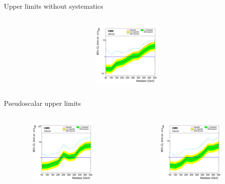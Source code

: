 \documentclass[8pt]{beamer}
\begin{document}
\begin{frame}{Upper limits without systematics}
\begin{columns}
\begin{column}{0.33\textwidth}
\begin{center}
     			\includegraphics[width=1.0\textwidth, height=90pt]{figs/limit_scalar2018.png}
    		\end{center}		
		\end{column}
\end{columns}

\begin{columns}
\begin{column}{1.09\textwidth}
\begin{block}{\centering Pseudoscalar upper limits}\end{block}
\end{column}
\end{columns} \vspace{-15pt}
\begin{columns}
		\begin{column}{0.33\textwidth}
			\begin{center}
     			\includegraphics[width=1.0\textwidth, height=90pt]{figs/limit_pseudo2016.png}
    		\end{center}		
		\end{column}
		\begin{column}{0.33\textwidth}
			\begin{center}
     			\includegraphics[width=1.0\textwidth, height=90pt]{figs/limit_pseudo2017.png}

\end{center}
\end{column}
\end{columns}
\end{frame}
\end{document}
